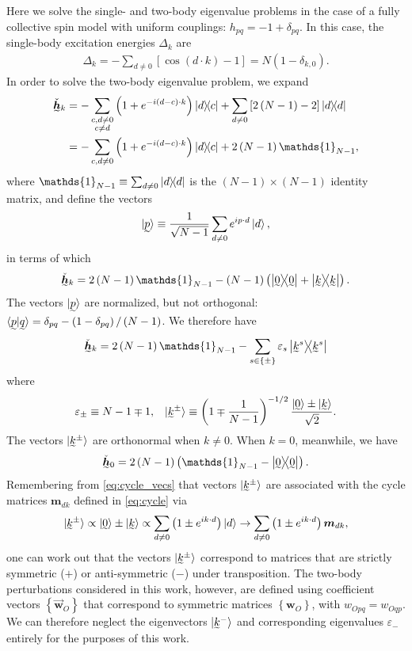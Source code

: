 \documentclass[nofootinbib,notitlepage,11pt]{revtex4-2}
\newcommand{\f}[2]{\dfrac{#1}{#2}} %
\newcommand{\p}[1]{\left(#1\right)} %
\renewcommand{\sp}[1]{\left[#1\right]} %
\renewcommand{\set}[1]{\left\{#1\right\}} %
\renewcommand{\c}{\cdot} %
\newcommand{\m}{\bm} %
\renewcommand{\v}{\vec} %
\newcommand{\1}{\mathds{1}}
\newcommand{\ut}{\undertilde}
\begin{document}
Here we solve the single- and two-body eigenvalue problems in the case
of a fully collective spin model with uniform couplings:
$h_{pq}=-1+\delta_{pq}$.  In this case, the single-body excitation
energies $\Delta_k$ are
\begin{align}
  \Delta_k
  = - \sum_{d\ne 0} \sp{\cos\p{d\c k}-1}
  = N \p{1-\delta_{k,0}}.
\end{align}
In order to solve the two-body eigenvalue problem, we expand
\begin{align}
  \ut{\check{\m h}}_k
  &= -\sum_{\substack{c,d\ne0\\c\ne d}}
  \p{1+e^{-i\p{d-c}\c k}} \op{d}{c}
  + \sum_{d\ne0} \sp{2\p{N-1}-2} \op{d} \\
  &= -\sum_{c,d\ne0} \p{1+e^{-i\p{d-c}\c k}} \op{d}{c}
  + 2\p{N-1} \1_{N-1},
\end{align}
where $\1_{N-1}\equiv\sum_{d\ne0}\op{d}$ is the $\p{N-1}\times\p{N-1}$
identity matrix, and define the vectors
\begin{align}
  \ket{\ut{p}}
  \equiv \f1{\sqrt{N-1}} \sum_{d\ne 0} e^{i p\c d}\ket{d},
\end{align}
in terms of which
\begin{align}
  \ut{\check{\m h}}_k
  = 2 \p{N-1} \1_{N-1} - \p{N-1} \p{\op{\ut{0}} + \op{\ut{k}}}.
\end{align}
The vectors $\ket{\ut{p}}$ are normalized, but not orthogonal:
$\braket{\ut{p}|\ut{q}}=\delta_{pq}-\p{1-\delta_{pq}}/\p{N-1}$.  We
therefore have
\begin{align}
  \ut{\check{\m h}}_k
  = 2 \p{N-1} \1_{N-1}
  - \sum_{s\in\set{\pm}} \varepsilon_s \op{\ut{k}^s}
\end{align}
where
\begin{align}
  \varepsilon_\pm \equiv N - 1 \mp 1,
  &&
  \ket{\ut{k}^\pm}
  \equiv \p{1\mp\f1{N-1}}^{-1/2}
  \f{\ket{\ut{0}}\pm\ket{\ut{k}}}{\sqrt{2}}.
\end{align}
The vectors $\ket{\ut{k}^\pm}$ are orthonormal when $k\ne0$.  When
$k=0$, meanwhile, we have
\begin{align}
  \ut{\check{\m h}}_0 = 2\p{N-1} \p{\1_{N-1} - \op{\ut{0}}}.
\end{align}
Remembering from \eqref{eq:cycle_vecs} that vectors $\ket{\ut{k}^\pm}$
are associated with the cycle matrices $\m m_{dk}$ defined in
\eqref{eq:cycle} via
\begin{align}
  \ket{\ut{k}^\pm}
  \propto \ket{\ut{0}} \pm \ket{\ut{k}}
  \propto \sum_{d\ne0} \p{1 \pm e^{ik\c d}} \ket{d}
  \to \sum_{d\ne0} \p{1 \pm e^{ik\c d}} \m m_{dk},
\end{align}
one can work out that the vectors $\ket{\ut{k}^\pm}$ correspond to
matrices that are strictly symmetric ($+$) or anti-symmetric ($-$)
under transposition.  The two-body perturbations considered in this
work, however, are defined using coefficient vectors
$\set{\v{\m w}_O}$ that correspond to symmetric matrices
$\set{\m w_O}$, with $w_{Opq}=w_{Oqp}$.  We can therefore neglect the
eigenvectors $\ket{\ut{k}^-}$ and corresponding eigenvalues
$\varepsilon_-$ entirely for the purposes of this work.
\end{document}
